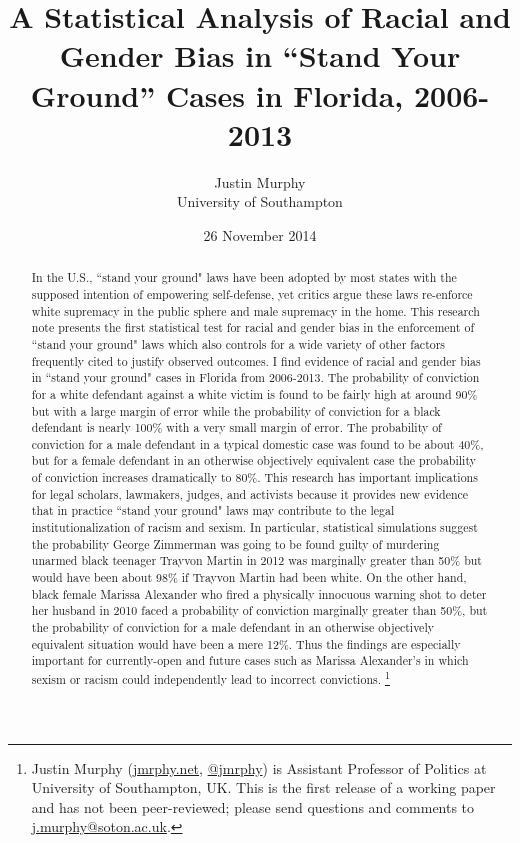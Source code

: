 \documentclass[12pt,article]{article}
\title{A Statistical Analysis of Racial and Gender Bias in ``Stand Your
Ground'' Cases in Florida, 2006-2013}
\author{Justin Murphy\\University of Southampton}
\date{26 November 2014}
\begin{document}
\maketitle


\begin{abstract}
In the U.S., ``stand your ground" laws have been adopted by most states with the supposed intention of empowering self-defense, yet critics argue these laws re-enforce white supremacy in the public sphere and male supremacy in the home. This research note presents the first statistical test for racial and gender bias in the enforcement of ``stand your ground" laws which also controls for a wide variety of other factors frequently cited to justify observed outcomes. I find evidence of racial and gender bias in ``stand your ground" cases in Florida from 2006-2013. The probability of conviction for a white defendant against a white victim is found to be fairly high at around 90\% but with a large margin of error while the probability of conviction for a black defendant is nearly 100\% with a very small margin of error. The probability of conviction for a male defendant in a typical domestic case was found to be about 40\%, but for a female defendant in an otherwise objectively equivalent case the probability of conviction increases dramatically to 80\%. This research has important implications for legal scholars, lawmakers, judges, and activists because it provides new evidence that in practice ``stand your ground" laws may contribute to the legal institutionalization of racism and sexism. In particular, statistical simulations suggest the probability George Zimmerman was going to be found guilty of murdering unarmed black teenager Trayvon Martin in 2012 was marginally greater than 50\% but would have been about 98\% if Trayvon Martin had been white. On the other hand, black female Marissa Alexander who fired a physically innocuous warning shot to deter her husband in 2010 faced a probability of conviction marginally greater than 50\%, but the probability of conviction for a male defendant in an otherwise objectively equivalent situation would have been a mere 12\%. Thus the findings are especially important for currently-open and future cases such as Marissa Alexander's in which sexism or racism could independently lead to incorrect convictions. \footnote{Justin Murphy (\url{jmrphy.net}, \href{http://twitter.com/jmrphy}{@jmrphy}) is Assistant Professor of Politics at University of Southampton, UK. This is the first release of a working paper and has not been peer-reviewed; please send questions and comments to \href{mailto:j.murphy@soton.ac.uk}{j.murphy@soton.ac.uk}.}
\end{abstract}
\onehalfspacing
\end{document}
